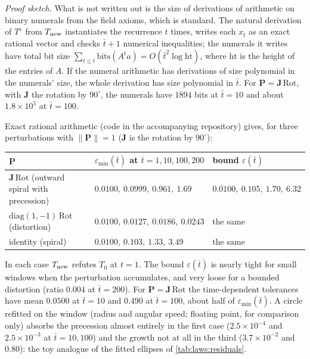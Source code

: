 \begin{remark}\label{rem:laws:correction}
\emph{Proof sketch.} What is not written out is the size of derivations of arithmetic on binary numerals from the field axioms, which is standard. The natural derivation of $T^{\varepsilon}$ from $T_{\rm new}$ instantiates the recurrence $t$ times, writes each $x_t$ as an exact rational vector and checks $\bar t+1$ numerical inequalities; the numerals it writes have total bit size $\sum_{t\le\bar t}\mathrm{bits}(A^ta)=O(\bar t^2\log\mathrm{ht})$, where $\mathrm{ht}$ is the height of the entries of $A$. If the numeral arithmetic has derivations of size polynomial in the numerals' size, the whole derivation has size polynomial in $\bar t$. For $\mathbf P=\mathbf J\,\mathrm{Rot}$, with $\mathbf J$ the rotation by $90^\circ$, the numerals have $1894$ bits at $\bar t=10$ and about $1.8\times10^5$ at $\bar t=100$.
\end{remark}

Exact rational arithmetic (code in the accompanying repository) gives, for three perturbations with $\lVert\mathbf P\rVert=1$ ($\mathbf J$ is the rotation by $90^\circ$):
\begin{center}\small
\begin{tabular}{lll}
\toprule
$\mathbf P$ & $\varepsilon_{\min}(\bar t)$ at $\bar t=1,10,100,200$ & bound $\varepsilon(\bar t)$\\
\midrule
$\mathbf J\,\mathrm{Rot}$ (outward spiral with precession) & $0.0100,\ 0.0999,\ 0.961,\ 1.69$ & $0.0100,\ 0.105,\ 1.70,\ 6.32$\\
$\mathrm{diag}(1,-1)\,\mathrm{Rot}$ (distortion) & $0.0100,\ 0.0127,\ 0.0186,\ 0.0243$ & the same\\
identity (spiral) & $0.0100,\ 0.103,\ 1.33,\ 3.49$ & the same\\
\bottomrule
\end{tabular}
\end{center}
In each case $T_{\rm new}$ refutes $T_0$ at $t=1$. The bound $\varepsilon(\bar t)$ is nearly tight for small windows when the perturbation accumulates, and very loose for a bounded distortion (ratio $0.004$ at $\bar t=200$). For $\mathbf P=\mathbf J\,\mathrm{Rot}$ the time-dependent tolerances have mean $0.0500$ at $\bar t=10$ and $0.490$ at $\bar t=100$, about half of $\varepsilon_{\min}(\bar t)$. A circle refitted on the window (radius and angular speed; floating point, for comparison only) absorbs the precession almost entirely in the first case ($2.5\times10^{-4}$ and $2.5\times10^{-3}$ at $\bar t=10,100$) and the growth not at all in the third ($3.7\times10^{-2}$ and $0.80$): the toy analogue of the fitted ellipses of \cref{tab:laws:residuals}.

